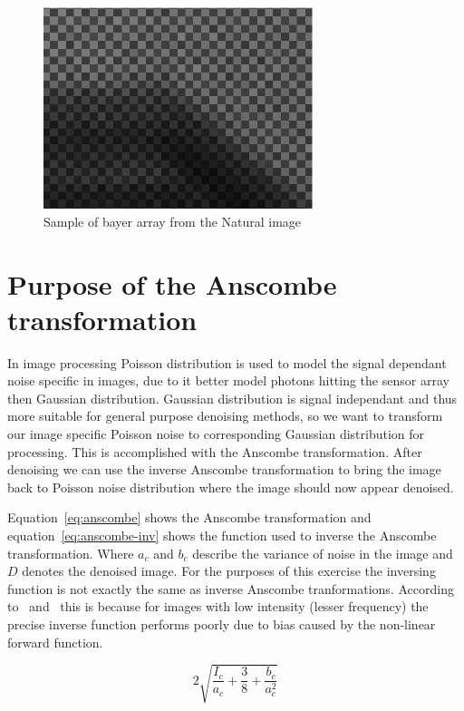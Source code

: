 \documentclass[12pt,a4paper,english
]{tunithesis}
\begin{document}
\begin{figure}[h]
  \centering
  \includegraphics[width=0.7\textwidth]{img/bayer_array.png}
  \caption{Sample of bayer array from the Natural image}
  \label{fig:bayer-array-illustrated}
\end{figure}

\section{Purpose of the Anscombe transformation}\label{sec:anscombe}
In image processing Poisson distribution is used to model the signal dependant noise specific in images, due to it better model photons hitting the sensor array then Gaussian distribution. Gaussian distribution is signal independant and thus more suitable for general purpose denoising methods, so we want to transform our image specific Poisson noise to corresponding Gaussian distribution for processing. This is accomplished with the Anscombe transformation. After denoising we can use the inverse Anscombe transformation to bring the image back to Poisson noise distribution where the image should now appear denoised.

Equation~\ref{eq:anscombe} shows the Anscombe transformation and equation~\ref{eq:anscombe-inv} shows the function used to inverse the Anscombe transformation. Where $a_{c}$ and $b_{c}$ describe the variance of noise in the image and $D$ denotes the denoised image. For the purposes of this exercise the inversing function is not exactly the same as inverse Anscombe tranformations. According to~\cite{poissonnoise2011} and~\cite{poissonnoise2011-2} this is because for images with low intensity (lesser frequency) the precise inverse function performs poorly due to bias caused by the non-linear forward function.

\begin{equation}
\label{eq:anscombe}
  2 \sqrt{\frac{I_{c}}{a_{c}} + \frac{3}{8} + \frac{b_{c}}{a_{c}^2}}
\end{equation}
\end{document}
